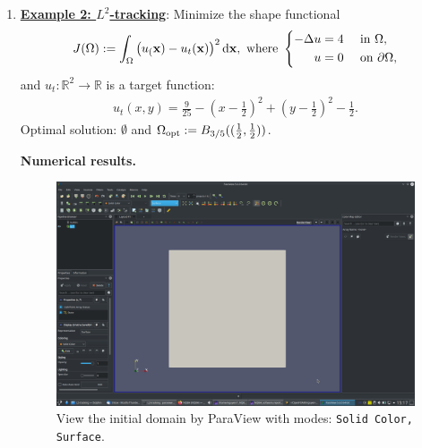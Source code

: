\documentclass[onsided]{book}
\numberwithin{equation}{section}
\begin{document}
\begin{enumerate}
\begin{enumerate}
        \item \href{https://fireshape.readthedocs.io/en/latest/example_L2tracking.html}{\textbf{Example 2: $L^2$-tracking}}: Minimize the shape functional
        \begin{equation*}
            J(\Omega) := \int_\Omega \left(u_({\bf x}) - u_t({\bf x})\right)^2{\rm d}{\bf x}, \mbox{ where } \left\{\begin{split}
                -\Delta u &= 4 &&\mbox{ in } \Omega,\\
                u &= 0 &&\mbox{ on } \partial\Omega,
            \end{split}\right.
        \end{equation*}
        and $u_t:\mathbb{R}^2\to\mathbb{R}$ is a target function:
        \begin{align*}
            u_t(x,y) = \frac{9}{25} - \left(x - \frac{1}{2}\right)^2 + \left(y - \frac{1}{2}\right)^2 - \frac{1}{2}.
        \end{align*}
        Optimal solution: $\emptyset$ and $\Omega_{\rm opt} := B_{3/5}((\frac{1}{2},\frac{1}{2}))$.
        
        \textbf{Numerical results.}
        
        \begin{figure}[H]
            \centering
            \includegraphics[height=0.44\textheight]{L2-tracking_initial_domain_Solid_Color_Surface}
            \caption{View the initial domain by ParaView with modes: \texttt{Solid Color, Surface}.}
        \end{figure}
        

\end{enumerate}
\end{enumerate}
\end{document}
